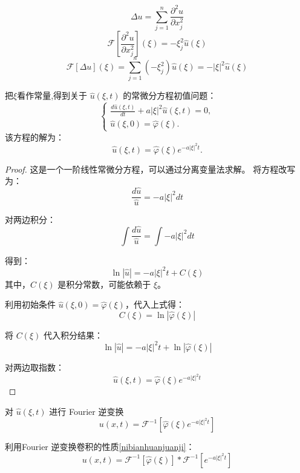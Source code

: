 \documentclass[12pt,a4paper]{article}
\numberwithin{subsection}{section}   %
\numberwithin{subsubsection}{subsection}
\theoremstyle{plain}
\theoremstyle{definition}
\theoremstyle{remark}
\theoremstyle{remark}
\begin{document}
	\[
	\Delta u = \sum_{j=1}^n \frac{\partial^2 u}{\partial x_j^2}
	\]
	\[
	\mathcal{F}\left[\frac{\partial^2 u}{\partial x_j^2}\right](\xi) = -\xi_j^2 \hat{u}(\xi)
	\]
	\begin{equation}
		\mathcal{F}[\Delta u](\xi) = \sum_{j=1}^n (-\xi_j^2) \hat{u}(\xi) = -|\xi|^2 \hat{u}(\xi)
	\end{equation}
	
	
	把$\xi$看作常量,得到关于 \(\hat{u}(\xi, t)\) 的常微分方程初值问题：
	\begin{equation}
		\begin{cases}
			\displaystyle \frac{d\hat{u}(\xi, t)}{dt} + a|\xi|^2 \hat{u}(\xi, t) = 0, \\
			\hat{u}(\xi, 0) = \hat{\varphi}(\xi).
		\end{cases}
	\end{equation}
	该方程的解为：
	\begin{equation}
		\hat{u}(\xi, t) = \hat{\varphi}(\xi) e^{-a|\xi|^2 t}.
	\end{equation}
	
	
	
	\begin{proof}
		这是一个一阶线性常微分方程，可以通过分离变量法求解。
		将方程改写为：
		\[
		\frac{d\hat{u}}{\hat{u}} = -a |\xi|^2 dt
		\]
		
		对两边积分：
		\[
		\int \frac{d\hat{u}}{\hat{u}} = \int -a |\xi|^2 dt
		\]
		
		得到：
		\[
		\ln|\hat{u}| = -a |\xi|^2 t + C(\xi)
		\]
		其中，\(C(\xi)\) 是积分常数，可能依赖于 \(\xi\)。
		
		
		利用初始条件 \(\hat{u}(\xi, 0) = \hat{\varphi}(\xi)\)，代入上式得：
		\[
		C(\xi) = \ln|\hat{\varphi}(\xi)|
		\]
		
		将 \(C(\xi)\) 代入积分结果：
		\[
		\ln|\hat{u}| = -a |\xi|^2 t + \ln|\hat{\varphi}(\xi)|
		\]
		
		对两边取指数：
		\[
		\hat{u}(\xi, t) = \hat{\varphi}(\xi) e^{-a |\xi|^2 t}
		\]
		
		
	\end{proof}
	
	
	对 \(\hat{u}(\xi, t)\) 进行 Fourier 逆变换
	\begin{equation}
		u(x, t) = \mathcal{F}^{-1}[\hat{\varphi}(\xi) e^{-a|\xi|^2 t}]
	\end{equation}
	
	利用Fourier 逆变换卷积的性质\eqref{nibianhuanjuanji}：
	\begin{equation}
		u(x, t) = \mathcal{F}^{-1}[\hat{\varphi}(\xi)] * \mathcal{F}^{-1}[e^{-a|\xi|^2 t}]
	\end{equation}
	
\end{document}

